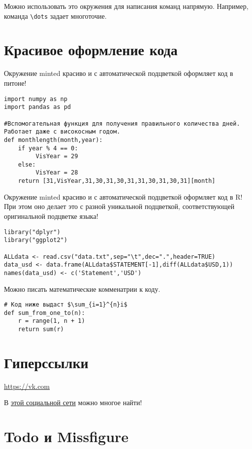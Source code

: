 \documentclass[12pt, a4paper]{article}
\begin{document}
Можно использовать это окружения для написания команд напрямую. Например, команда \verb"\dots" задает многоточие.

\newpage
\section{Красивое оформление кода}

Окружение minted красиво и с автоматической подцветкой оформляет код в питоне!

\begin{verbatim}
import numpy as np
import pandas as pd

#Вспомогательная функция для получения правильного количества дней. Работает даже с високосным годом.
def monthlength(month,year):
    if year % 4 == 0:
         VisYear = 29
    else:
         VisYear = 28
    return [31,VisYear,31,30,31,30,31,31,30,31,30,31][month]
\end{verbatim} 

Окружение minted красиво и с автоматической подцветкой оформляет код в R! При этом оно делает это с разной уникальной подцветкой, соответствующей оригинальной подцветке языка! 

\begin{verbatim}
library("dplyr")
library("ggplot2")

ALLdata <- read.csv("data.txt",sep="\t",dec=".",header=TRUE)
data_usd <- data.frame(ALLdata$STATEMENT[-1],diff(ALLdata$USD,1))
names(data_usd) <- c('Statement','USD')
\end{verbatim} 

Можно писать математические комменатрии к коду.

\begin{verbatim}
# Код ниже выдаст $\sum_{i=1}^{n}i$
def sum_from_one_to(n):
	r = range(1, n + 1)
	return sum(r)
\end{verbatim}

\newpage
\section{Гиперссылки}

\url{https://vk.com}

В \href{https://vk.com}{этой социальной сети} можно многое найти!

\section{Todo и Missfigure}

\end{document}
